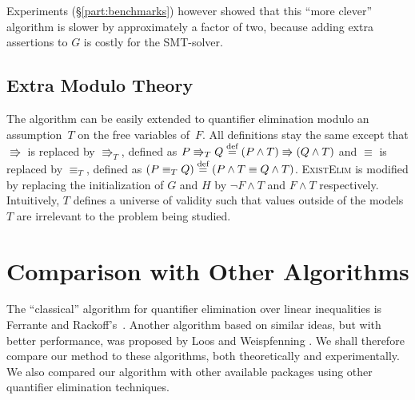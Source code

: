 Experiments (\S\ref{part:benchmarks}) however showed that this ``more clever'' algorithm is slower by approximately a factor of two, because adding extra assertions to $G$ is costly for the SMT-solver.

\subsection{Extra Modulo Theory}
The algorithm can be easily extended to quantifier elimination modulo an assumption~$T$ on the free variables of~$F$. All definitions stay the same except that $\Rrightarrow$ is replaced by $\Rrightarrow_T$, defined as $P \Rrightarrow_T Q \stackrel{\text{def}}{=} (P \wedge T) \Rrightarrow (Q \wedge T)$ and $\equiv$ is replaced by $\equiv_T$, defined as $(P \equiv_T Q) \stackrel{\text{def}}{=} (P \wedge T \equiv Q \wedge T)$. \textsc{ExistElim} is modified by replacing the initialization of $G$ and $H$ by $\neg F \wedge T$ and $F \wedge T$ respectively. Intuitively, $T$ defines a universe of validity such that values outside of the models $T$ are irrelevant to the problem being studied.

\section{Comparison with Other Algorithms}
The ``classical'' algorithm for quantifier elimination over linear inequalities is Ferrante and Rackoff's~\cite{FerranteRackoff75}. Another algorithm based on similar ideas, but with better performance, was proposed by Loos and Weispfenning \cite{LoosWeispfenning93}.
We shall therefore compare our method to these algorithms, both theoretically and experimentally. We also compared our algorithm with other available packages using other quantifier elimination techniques.

